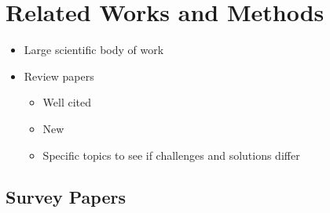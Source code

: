 \documentclass{article}
\begin{document}
\section{Related Works and Methods}
\begin{itemize}
    \item Large scientific body of work
    \item Review papers
          \begin{itemize}
              \item Well cited
              \item New
              \item Specific topics to see if challenges and solutions differ
          \end{itemize}
\end{itemize}

\subsection{Survey Papers}
\end{document}
